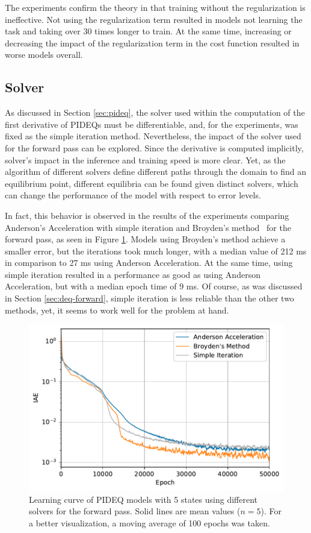 The experiments confirm the theory in that training without the regularization is ineffective.
Not using the regularization term resulted in models not learning the task and taking over 30 times longer to train.
At the same time, increasing or decreasing the impact of the regularization term in the cost function resulted in worse models overall.

\subsection{Solver}

As discussed in Section \ref{sec:pideq}, the solver used within the computation of the first derivative of \glspl{PIDEQ} must be differentiable, and, for the experiments, was fixed as the simple iteration method.
Nevertheless, the impact of the solver used for the forward pass can be explored.
Since the derivative is computed implicitly, solver's impact in the inference and training speed is more clear.
Yet, as the algorithm of different solvers define different paths through the domain to find an equilibrium point, different equilibria can be found given distinct solvers, which can change the performance of the model with respect to error levels. 

In fact, this behavior is observed in the results of the experiments comparing Anderson's Acceleration with simple iteration and Broyden's method~\cite{broyden_class_1965} for the forward pass, as seen in Figure \ref{fig:solver-iae}.
Models using Broyden's method achieve a smaller error, but the iterations took much longer, with a median value of 212 ms in comparison to 27 ms using Anderson Acceleration.
At the same time, using simple iteration resulted in a performance as good as using Anderson Acceleration, but with a median epoch time of 9 ms.
Of course, as was discussed in Section \ref{sec:deq-forward}, simple iteration is less reliable than the other two methods, yet, it seems to work well for the problem at hand.

\begin{figure}[h]
    \centering
    \includegraphics{images/exp_5_iae.pdf}
    \caption{Learning curve of \gls{PIDEQ} models with 5 states using different solvers for the forward pass. Solid lines are mean values ($n=5$). For a better visualization, a moving average of 100 epochs was taken.}
    \label{fig:solver-iae}
\end{figure}

